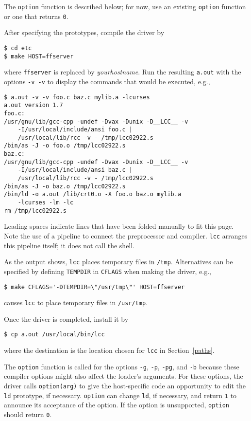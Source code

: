 The \verb|option| function is described below;
for now, use an existing \verb|option| function or one that returns \verb|0|.

After specifying the prototypes, compile the driver by
\begin{verbatim}
$ cd etc
$ make HOST=ffserver
\end{verbatim}
where \verb|ffserver| is replaced by {\it yourhostname}.
Run the resulting \verb|a.out| with the options \verb|-v -v|
to display the commands that would be executed, e.g.,
\begin{verbatim}
$ a.out -v -v foo.c baz.c mylib.a -lcurses
a.out version 1.7
foo.c:
/usr/gnu/lib/gcc-cpp -undef -Dvax -Dunix -D__LCC__ -v
    -I/usr/local/include/ansi foo.c |
    /usr/local/lib/rcc -v - /tmp/lcc02922.s
/bin/as -J -o foo.o /tmp/lcc02922.s
baz.c:
/usr/gnu/lib/gcc-cpp -undef -Dvax -Dunix -D__LCC__ -v
    -I/usr/local/include/ansi baz.c |
    /usr/local/lib/rcc -v - /tmp/lcc02922.s
/bin/as -J -o baz.o /tmp/lcc02922.s
/bin/ld -o a.out /lib/crt0.o -X foo.o baz.o mylib.a
    -lcurses -lm -lc
rm /tmp/lcc02922.s
\end{verbatim}
Leading spaces indicate lines that have been folded manually to fit this page.
Note the use of a pipeline to connect the preprocessor and compiler.
\verb|lcc| arranges this pipeline itself; it does not call the shell.
 
As the output shows, \verb|lcc| places temporary files in \verb|/tmp|.
Alternatives can be specified by defining \verb|TEMPDIR| in \verb|CFLAGS|
when making the driver, e.g.,
\begin{verbatim}
$ make CFLAGS='-DTEMPDIR=\"/usr/tmp\"' HOST=ffserver
\end{verbatim}
causes \verb|lcc| to place temporary files in \verb|/usr/tmp|.

Once the driver is completed, install it by
\begin{verbatim}
$ cp a.out /usr/local/bin/lcc
\end{verbatim}
where the destination is the location chosen for \verb|lcc| in Section~\ref{paths}.

The \verb|option| function is called for the options
\verb|-g|, \verb|-p|, \verb|-pg|, and \verb|-b| because these compiler options might
also affect the loader's arguments. For these options,
the driver calls \verb|option(arg)| to give the host-specific
code an opportunity to edit the \verb|ld| prototype, if necessary.
\verb|option| can change \verb|ld|, if necessary, and return \verb|1| to
announce its acceptance of the option. If the option
is unsupported, \verb|option| should return \verb|0|.

